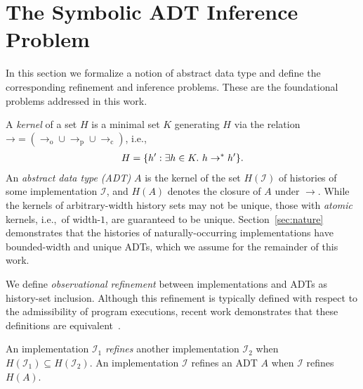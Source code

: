 \section{The Symbolic ADT Inference Problem}
\label{sec:inference}

In this section we formalize a notion of abstract data type and define the
corresponding refinement and inference problems. These are the foundational
problems addressed in this work.

A \emph{kernel} of a set $H$ is a minimal set $K$ generating $H$ via the
relation $\mathord\to = (\to_\mathrm{o} \cup \to_\mathrm{p} \cup
\to_\mathrm{c})$, i.e.,
\begin{align*}
  H = {\{{ h' : \exists h \in K.\ h \to^\ast h' }\}}.
\end{align*}
An \emph{abstract data type (ADT)} $A$ is the kernel of the set $H(\mathcal{I})$
of histories of some implementation $\mathcal{I}$, and $H(A)$ denotes the
closure of $A$ under $\to$. While the kernels of arbitrary-width history sets
may not be unique, those with \emph{atomic} kernels, i.e.,~of width-$1$, are
guaranteed to be unique. Section~\ref{sec:nature} demonstrates that the
histories of naturally-occurring implementations have bounded-width and
unique ADTs, which we assume for the remainder of this work.

We define \emph{observational refinement} between implementations and ADTs as
history-set inclusion. Although this refinement is typically defined with
respect to the admissibility of program executions, recent work demonstrates
that these definitions are equivalent~\cite{conf/popl/BouajjaniEEH15}.

\begin{definition}

  An implementation $\mathcal{I}_1$ \emph{refines} another implementation
  $\mathcal{I}_2$ when $H(\mathcal{I}_1) \subseteq H(\mathcal{I}_2)$. An
  implementation $\mathcal{I}$ refines an ADT $A$ when $\mathcal{I}$ refines
  $H(A)$.

\end{definition}


